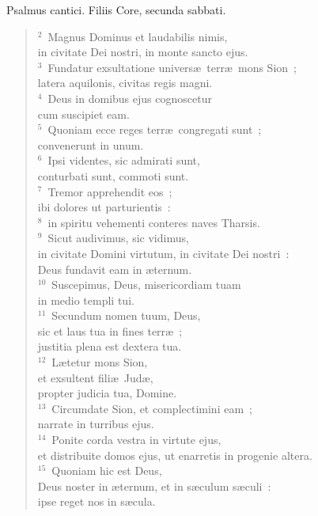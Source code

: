\lettrine[lines=3,image=true,loversize=0.05,lraise=-0.03]{P}{}salmus cantici. Filiis Core, secunda sabbati.
\begin{flushleft}\begin{verse}\vspace{6pt}${}^{2}$~Magnus Dominus et laudabilis nimis,\\ in civitate Dei nostri, in monte sancto ejus.\\
${}^{3}$~Fundatur exsultatione univers\ae\ terr\ae\ mons Sion~;\\ latera aquilonis, civitas regis magni.\\
${}^{4}$~Deus in domibus ejus cognoscetur\\ cum suscipiet eam.\\
${}^{5}$~Quoniam ecce reges terr\ae\ congregati sunt~;\\ convenerunt in unum.\\
${}^{6}$~Ipsi videntes, sic admirati sunt,\\ conturbati sunt, commoti sunt.\\
${}^{7}$~Tremor apprehendit eos~;\\ ibi dolores ut parturientis~:\\
${}^{8}$~in spiritu vehementi conteres naves Tharsis.\\
${}^{9}$~Sicut audivimus, sic vidimus,\\ in civitate Domini virtutum, in civitate Dei nostri~:\\ Deus fundavit eam in \ae ternum.\\
${}^{10}$~Suscepimus, Deus, misericordiam tuam\\ in medio templi tui.\\
${}^{11}$~Secundum nomen tuum, Deus,\\ sic et laus tua in fines terr\ae~;\\ justitia plena est dextera tua.\\
${}^{12}$~L\ae tetur mons Sion,\\ et exsultent fili\ae\ Jud\ae ,\\ propter judicia tua, Domine.\\
${}^{13}$~Circumdate Sion, et complectimini eam~;\\ narrate in turribus ejus.\\
${}^{14}$~Ponite corda vestra in virtute ejus,\\ et distribuite domos ejus, ut enarretis in progenie altera.\\
${}^{15}$~Quoniam hic est Deus,\\ Deus noster in \ae ternum, et in s\ae culum s\ae culi~:\\ ipse reget nos in s\ae cula.\end{verse}\end{flushleft}



